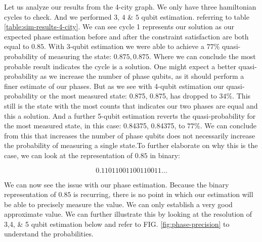 \documentclass[msc,oneside]{ubcthesis}
\begin{document}
	Let us analyze our results from the 4-city graph. We only have three hamiltonian cycles to check. And we performed $3$, $4$ \& $5$ qubit estimation. referring to table \ref{table:sim-results-4-city}. We can see cycle 1 represents our solution as our expected phase estimation before and after the constraint satisfaction are both equal to $0.85$. With 3-qubit estimation we were able to achieve a $77\%$ quasi-probability of measuring the state: $0.875, 0.875$. Where we can conclude the most probable result indicates the cycle is a solution. One might expect a better quasi-probability as we increase the number of phase qubits, as it should perform a finer estimate of our phases. But as we see with 4-qubit estimation our quasi-probability  or the most measured state: 0.875, 0.875, has dropped to $34\%$.  This still is the state with the most counts that indicates our two phases are equal and this a solution. And a further 5-qubit estimation reverts the quasi-probability for the most measured state, in this case: 0.84375, 0.84375, to $77\%$. We can conclude from this that increases the number of phase qubits does not necessarily increase the probability of measuring a single state.To further elaborate on why this is the case, we can look at the representation of $0.85$ in binary:
	
	$$0.11011001100110011...$$
	
	We can now see the issue with our phase estimation. Because the binary representation of $0.85$ is recurring, there is no point in which our estimation will be able to precisely measure the value. We can only establish a very good approximate value. We can further illustrate this by looking at the resolution of 3,4, \& 5 qubit estimation below and refer to FIG. \ref{fig:phase-precision} to understand the probabilities.
	
	
\end{document}
